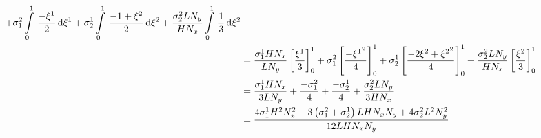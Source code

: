 \begin{equation}
\begin{aligned}
    +\conductivitytensorsymbol^{2}_{1}\gint{0}{1}{\dfrac{-\xione}{2}}{\xione}
    +\conductivitytensorsymbol^{1}_{2}\gint{0}{1}{\dfrac{-1+\xitwo}{2}}{\xitwo}
    +\dfrac{\conductivitytensorsymbol^{2}_{2} L N_{y}}{H N_{x}}\gint{0}{1}{\dfrac{1}{3}}{\xitwo} \\
    &=\dfrac{\conductivitytensorsymbol^{1}_{1} H N_{x}}{L N_{y}}\sqbrac{\dfrac{\xione}{3}}^{1}_{0}
    +\conductivitytensorsymbol^{2}_{1}\sqbrac{\dfrac{-\xionesq}{4}}^{1}_{0}
    +\conductivitytensorsymbol^{1}_{2}\sqbrac{\dfrac{-2\xitwo+\xitwosq}{4}}^{1}_{0}
    +\dfrac{\conductivitytensorsymbol^{2}_{2} L N_{y}}{H N_{x}}\sqbrac{\dfrac{\xitwo}{3}}^{1}_{0} \\
    &=\dfrac{\conductivitytensorsymbol^{1}_{1} H N_{x}}{3 L N_{y}}+\dfrac{-\conductivitytensorsymbol^{2}_{1}}{4}+
    \dfrac{-\conductivitytensorsymbol^{1}_{2}}{4}+\dfrac{\conductivitytensorsymbol^{2}_{2} L N_{y}}{3 H N_{x}} \\
    &=\dfrac{4\conductivitytensorsymbol^{1}_{1}H^{2}N_{x}^{2}-3\pbrac{\conductivitytensorsymbol^{2}_{1}+
        \conductivitytensorsymbol^{1}_{2}}L H N_{x} N_{y}+4\conductivitytensorsymbol^{2}_{2}L^{2}N_{y}^{2}}{12 L H N_{x} N_{y}}
  \end{aligned}
\end{equation}

